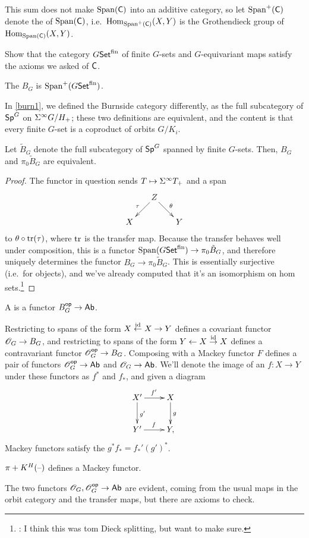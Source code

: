 This sum does not make $\operatorname{Span}(\mathsf C)$ into an additive category, so let $\operatorname{Span}^+(\mathsf C)$ denote the  of $\operatorname{Span}(\mathsf C)$, i.e.\ $\operatorname{Hom}_{\operatorname{Span}^+(\mathsf C)}(X,Y)$ is the Grothendieck group of
$\operatorname{Hom}_{\operatorname{Span}(\mathsf C)}(X,Y)$.
\begin{ex}
Show that the category $G\mathsf{Set}^{\mathrm{fin}}$ of finite $G$-sets and $G$-equivariant maps satisfy the axioms we
asked of $\mathsf C$.
\end{ex}
\begin{defn}
The  $B_G$ is $\operatorname{Span}^+(G\mathsf{Set}^{\mathrm{fin}})$.
\end{defn}
In \cref{burn1}, we defined the Burnside category differently, as the full subcategory of $\mathsf{Sp}^G$ on $\Sigma^\infty G/H_+$;
these two definitions are equivalent, and the content is that every finite $G$-set is a coproduct of orbits
$G/K_i$.
\begin{prop}
Let $\tilde B_G$ denote the full subcategory of $\mathsf{Sp}^G$ spanned by finite $G$-sets. Then, $B_G$ and $\pi_0\tilde
B_G$ are equivalent.
\end{prop}
\begin{proof}
The functor in question sends $T\mapsto\sus T_+$ and a span
\[\xymatrix@dr{
	Z\ar[r]^\theta\ar[d]_\tau & Y\\
	X
}\]
to $\theta\circ\operatorname{tr}(\tau)$, where $\operatorname{tr}$ is the transfer map. Because the transfer behaves well under composition,
this is a functor $\operatorname{Span}(G\mathsf{Set}^{\mathrm{fin}})\to\pi_0\tilde B_G$, and therefore uniquely determines the functor
$B_G\to\pi_0\tilde B_G$. This is essentially surjective (i.e.\ for objects), and we've already computed that it's
an isomorphism on hom sets.\footnote{\TODO: I think this was tom Dieck splitting, but want to make sure.}
\end{proof}
\begin{defn}
A  is a functor $B_G^{\mathsf{op}}\to\mathsf{Ab}$.
\end{defn}
Restricting to spans of the form $X\stackrel{\mathrm{id}}\gets X\to Y$ defines a covariant functor
$\mathscr O_G\to B_G$, and restricting to spans of the form $Y\gets X\stackrel{\mathrm{id}}\to X$ defines a contravariant functor
$\mathscr O_G^{\mathsf{op}}\to B_G$. Composing with a Mackey functor $F$ defines a pair of functors $\mathscr O_G^{\mathsf{op}}\to\mathsf{Ab}$ and
$\mathscr O_G\to\mathsf{Ab}$. We'll denote the image of an $f\colon X\to Y$ under these functors as $f^*$ and $f_*$, and given a
diagram
\[\xymatrix{
	X'\ar[r]^{f'}\ar[d]^{g'} & X\ar[d]^g\\
	Y'\ar[r]^f & Y,
}\]
Mackey functors satisfy the  $g^*f_* = f_*'(g')^*$.
\begin{prop}
$\pi+K^H(\text{--})$ defines a Mackey functor.
\end{prop}
The two functors $\mathscr O_G,\mathscr O_G^{\mathsf{op}}\to\mathsf{Ab}$ are evident, coming from the usual maps in the orbit category and the
transfer maps, but there are axioms to check.

